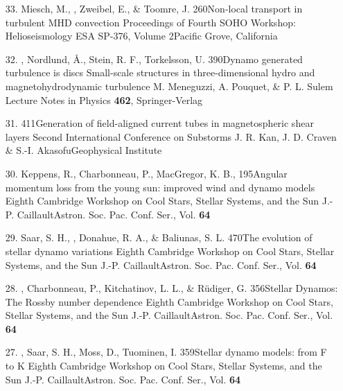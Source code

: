 \begin{itemize}
\item[33.]
Miesch, M., \Brandenburg, Zweibel, E., \& Toomre, J.
{260}{Non-local transport in turbulent MHD convection}
{Proceedings of Fourth SOHO Workshop: Helioseismology}
{ESA SP-376, Volume 2}{Pacific Grove, California}

\item[32.]
\Brandenburg, Nordlund, \AA., Stein, R. F., Torkelsson, U.
{390}{Dynamo generated turbulence is discs}
{Small-scale structures in three-dimensional hydro and
magnetohydrodynamic turbulence}
{M. Meneguzzi, A. Pouquet, \& P. L. Sulem}
{Lecture Notes in Physics {\bf 462}, Springer-Verlag}

\item[31.]
\Brandenburg{}
{411}{Generation of field-aligned current tubes in magnetospheric shear layers}
{Second International Conference on Substorms}
{J. R. Kan, J. D. Craven \& S.-I. Akasofu}{Geophysical Institute}

\item[30.]
Keppens, R., Charbonneau, P., MacGregor, K. B., \Brandenburg{}
{195}{Angular momentum loss from the young sun: improved wind and dynamo models}
{Eighth Cambridge Workshop on Cool Stars, Stellar Systems, and the Sun}
{J.-P. Caillault}{Astron. Soc. Pac. Conf. Ser., Vol. {\bf 64}}

\item[29.]
Saar, S. H., \Brandenburg, Donahue, R. A., \& Baliunas, S. L.
{470}{The evolution of stellar dynamo variations}
{Eighth Cambridge Workshop on Cool Stars, Stellar Systems, and the Sun}
{J.-P. Caillault}{Astron. Soc. Pac. Conf. Ser., Vol. {\bf 64}}

\item[28.]
\Brandenburg, Charbonneau, P., Kitchatinov, L. L., \& R\"udiger, G.
{356}{Stellar Dynamos: The Rossby number dependence}
{Eighth Cambridge Workshop on Cool Stars, Stellar Systems, and the Sun}
{J.-P. Caillault}{Astron. Soc. Pac. Conf. Ser., Vol. {\bf 64}}

\item[27.]
\Brandenburg, Saar, S. H., Moss, D., Tuominen, I.
{359}{Stellar dynamo models: from F to K}
{Eighth Cambridge Workshop on Cool Stars, Stellar Systems, and the Sun}
{J.-P. Caillault}{Astron. Soc. Pac. Conf. Ser., Vol. {\bf 64}}


\end{itemize}
